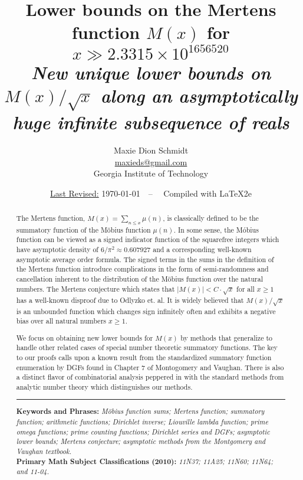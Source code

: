 \documentclass[11pt,reqno,a4letter]{article}
\title{
       \LARGE{
       Lower bounds on the Mertens function $M(x)$ for $x \gg 2.3315 \times 10^{1656520}$ 
       } \\ 
       \large{\it New unique lower bounds on $M(x) / \sqrt{x}$ along an asymptotically 
          huge infinite subsequence of reals} 
}
\author{{\large Maxie Dion Schmidt} \\ 
        {\normalsize \href{mailto:maxieds@gmail.com}{maxieds@gmail.com}} \\[0.1cm] 
        {\small Georgia Institute of Technology} 
}
\date{\small\underline{Last Revised:} \today\ \ -- \ \ Compiled with \LaTeX2e}
\numberwithin{figure}{section}
\numberwithin{table}{section}
\theoremstyle{plain}
\numberwithin{theorem}{section}
\theoremstyle{definition}
\begin{document}
 

\maketitle

\begin{abstract} 
The Mertens function, $M(x) = \sum_{n \leq x} \mu(n)$, is classically 
defined to be the summatory function of the M\"obius function 
$\mu(n)$. In some sense, the M\'obius function can be viewed as a 
signed indicator function of the squarefree integers which have 
asymptotic density of $6 / \pi^2 \approx 0.607927$ and a corresponding 
well-known asymptotic average order formula. The signed terms in the 
sums in the definition of the Mertens function introduce complications 
in the form of semi-randomness and cancellation inherent to the 
distribution of the M\"obius function over the natural numbers. The 
Mertens conjecture which states that $|M(x)| < C \cdot \sqrt{x}$ for all 
$x \geq 1$ has a well-known disproof due to Odlyzko et. al. 
It is widely believed that $M(x) / \sqrt{x}$ is an unbounded function 
which changes sign infinitely often and exhibits a negative bias 
over all natural numbers $x \geq 1$. 

We focus on obtaining new lower bounds 
for $M(x)$ by methods that generalize to handle other related cases of 
special number theoretic summatory functions. 
The key to our proofs calls upon a known result from the standardized 
summatory function enumeration by DGFs found in Chapter 7 of 
Montogomery and Vaughan. There is also a distinct flavor of combinatorial analysis 
peppered in with the standard methods from analytic number theory which distinguishes 
our methods. 

\bigskip\hrule\bigskip
\noindent
\textbf{Keywords and Phrases:} {\it M\"obius function sums; Mertens function; summatory function; 
                                    arithmetic functions; 
                                    Dirichlet inverse; Liouville lambda function; prime omega functions; 
                                    prime counting functions; Dirichlet series and DGFs; 
                                    asymptotic lower bounds; Mertens conjecture; 
                                    asymptotic methods from the Montgomery and Vaughan textbook. } \\ 
\textbf{Primary Math Subject Classifications (2010):} {\it 11N37; 11A25; 11N60; 11N64; and 11-04. } 
\end{abstract}
\end{document}
